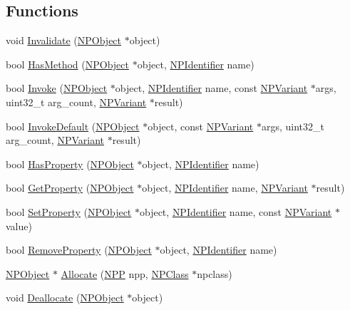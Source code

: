 \subsection*{Functions}
\begin{DoxyCompactItemize}
\item 
void \hyperlink{namespacepi__generator_a733df66e71ec7f2dba460c638180aa0e}{Invalidate} (\hyperlink{struct_n_p_object}{NPObject} $\ast$object)
\item 
bool \hyperlink{namespacepi__generator_a952c6436fb4cc8d87e830f81f3bae284}{HasMethod} (\hyperlink{struct_n_p_object}{NPObject} $\ast$object, \hyperlink{npruntime_8h_a3ce51391e08bd3e24128c342b1d055b9}{NPIdentifier} name)
\item 
bool \hyperlink{namespacepi__generator_a861f69824d0671573232af470d07c0fa}{Invoke} (\hyperlink{struct_n_p_object}{NPObject} $\ast$object, \hyperlink{npruntime_8h_a3ce51391e08bd3e24128c342b1d055b9}{NPIdentifier} name, const \hyperlink{struct___n_p_variant}{NPVariant} $\ast$args, uint32\_\-t arg\_\-count, \hyperlink{struct___n_p_variant}{NPVariant} $\ast$result)
\item 
bool \hyperlink{namespacepi__generator_a7fab356f3ceba853332861bcc927c54f}{InvokeDefault} (\hyperlink{struct_n_p_object}{NPObject} $\ast$object, const \hyperlink{struct___n_p_variant}{NPVariant} $\ast$args, uint32\_\-t arg\_\-count, \hyperlink{struct___n_p_variant}{NPVariant} $\ast$result)
\item 
bool \hyperlink{namespacepi__generator_a87a1eff2d42a1e673e616057680369b7}{HasProperty} (\hyperlink{struct_n_p_object}{NPObject} $\ast$object, \hyperlink{npruntime_8h_a3ce51391e08bd3e24128c342b1d055b9}{NPIdentifier} name)
\item 
bool \hyperlink{namespacepi__generator_aa945b983b43a437de8e06ebbbe8f6064}{GetProperty} (\hyperlink{struct_n_p_object}{NPObject} $\ast$object, \hyperlink{npruntime_8h_a3ce51391e08bd3e24128c342b1d055b9}{NPIdentifier} name, \hyperlink{struct___n_p_variant}{NPVariant} $\ast$result)
\item 
bool \hyperlink{namespacepi__generator_a54b3ed1c0ca9069974a0a575680896c9}{SetProperty} (\hyperlink{struct_n_p_object}{NPObject} $\ast$object, \hyperlink{npruntime_8h_a3ce51391e08bd3e24128c342b1d055b9}{NPIdentifier} name, const \hyperlink{struct___n_p_variant}{NPVariant} $\ast$value)
\item 
bool \hyperlink{namespacepi__generator_ae5666fa423e3664b2c082f0e8b2fcfd4}{RemoveProperty} (\hyperlink{struct_n_p_object}{NPObject} $\ast$object, \hyperlink{npruntime_8h_a3ce51391e08bd3e24128c342b1d055b9}{NPIdentifier} name)
\item 
\hyperlink{struct_n_p_object}{NPObject} $\ast$ \hyperlink{namespacepi__generator_a94f67bed2d50304566aa1f7c35f91ab2}{Allocate} (\hyperlink{struct___n_p_p}{NPP} npp, \hyperlink{struct_n_p_class}{NPClass} $\ast$npclass)
\item 
void \hyperlink{namespacepi__generator_a36cb8ad170a393eedf2f477fa7561f62}{Deallocate} (\hyperlink{struct_n_p_object}{NPObject} $\ast$object)
\end{DoxyCompactItemize}



